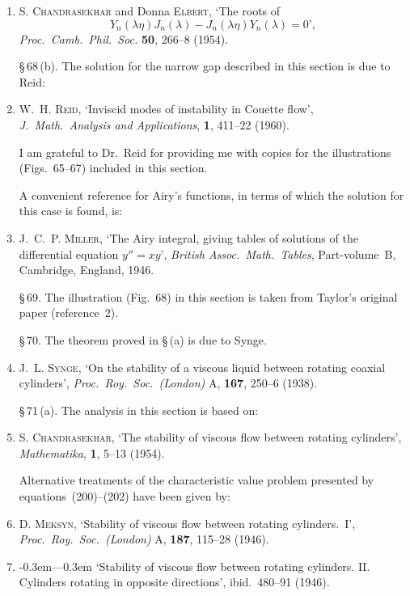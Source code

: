 \begin{enumerate}
\item S. \textsc{Chandrasekhar} and Donna \textsc{Elbert}, `The roots of
\[
Y_n(\lambda\eta)J_n(\lambda) - J_n(\lambda\eta)Y_n(\lambda) = 0\text{'},
\]
\textit{Proc.\ Camb.\ Phil.\ Soc.} \textbf{50}, 266--8 (1954).

\medskip
\noindent\S\,68\,(b).  The solution for the narrow gap described in this section is due to Reid:

\item W.~H. \textsc{Reid}, `Inviscid modes of instability in Couette flow', \textit{J.\ Math.\
Analysis and Applications}, \textbf{1}, 411--22 (1960).

\noindent I am grateful to Dr.~Reid for providing me with copies for the illustrations
(Figs.~65--67) included in this section.

\noindent A convenient reference for Airy's functions, in terms of which the solution for
this case is found, is:

\item J.~C.~P. \textsc{Miller}, `The Airy integral, giving tables of solutions of the
differential equation $y'' = xy$', \textit{British Assoc.\ Math.\ Tables}, Part-volume~B,
Cambridge, England, 1946.

\medskip
\noindent\S\,69.  The illustration (Fig.~68) in this section is taken from Taylor's original
paper (reference~2).

\noindent\S\,70.  The theorem proved in \S\,(a) is due to Synge.

\item J.~L. \textsc{Synge}, `On the stability of a viscous liquid between rotating coaxial
cylinders', \textit{Proc.\ Roy.\ Soc.\ (London)} A, \textbf{167}, 250--6 (1938).

\medskip
\noindent\S\,71\,(a).  The analysis in this section is based on:

\item S. \textsc{Chandrasekhar}, `The stability of viscous flow between rotating cylin\-ders',
\textit{Mathematika}, \textbf{1}, 5--13 (1954).

\noindent Alternative treatments of the characteristic value problem presented by equa\-tions~(200)--(202) have been given by:

\item D. \textsc{Meksyn}, `Stability of viscous flow between rotating cylinders.~I',
\textit{Proc.\ Roy.\ Soc.\ (London)} A, \textbf{187}, 115--28 (1946).

\item \leavevmode\kern-0.3em---\kern0.3em `Stability of viscous flow between rotating cylinders.  II. Cylinders
rotating in opposite directions', ibid.\ 480--91 (1946).


\end{enumerate}
